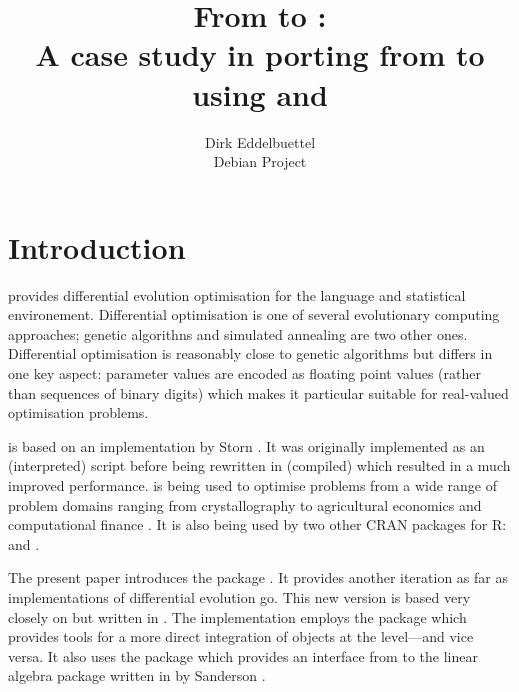 \documentclass[nojss,shortnames,article]{jss}
\author{Dirk Eddelbuettel\\Debian Project} %
\title{From \pkg{DEoptim} to \pkg{RcppDE}: \\
  A case study in porting from \proglang{C} to \proglang{C++} \\
  using \pkg{Rcpp} and \pkg{RcppArmadillo}}
\begin{document}
\section{Introduction}

\citep{MullenArdiaEtAl:2009:DEoptim,ArdiaBoudtCarlEtAl:2010:DEoptim,CRAN:DEoptim}
provides differential evolution optimisation for the  language
and statistical environement.  Differential optimisation is one of several
evolutionary computing approaches; genetic algorithns and simulated annealing
are two other ones.  Differential optimisation is reasonably close to genetic
algorithms but differs in one key aspect: parameter values are encoded as
floating point values (rather than sequences of binary digits) which makes it
particular suitable for real-valued optimisation problems.

 is based on an implementation by Storn
\citep{PriceStornLampinen:2006:DE}. It was originally implemented as an
(interpreted)  script before being rewritten in (compiled)
 which resulted in a much improved performance.  is
being used to optimise problems from a wide range of problem domains ranging
from crystallography \citep{MullenKrayzmanLevin:2010:Atomic} to agricultural
economics \citep{BoernerHigginsKantelhardt:2007:Rainfall} and computational
finance \citep{BoudtPetersonCarl:2008:HFPortfolio}. It is also being used by
two other CRAN packages for R:  \citep{CRAN:micEconCES} and
 \citep{CRAN:selectMeta}.

The present paper introduces the  package . It
provides another iteration as far as implementations of differential
evolution go. This new version is based very closely on  but
written in . The implementation employs the  package
\citep{CRAN:Rcpp} which provides tools for a more direct integration of
 objects at the  level---and vice versa. It also
uses the  package \citep{CRAN:RcppArmadillo} which
provides an interface from  to the  linear algebra
package written in  by Sanderson
\citep{Sanderson:2010:Armadillo}.
\end{document}
